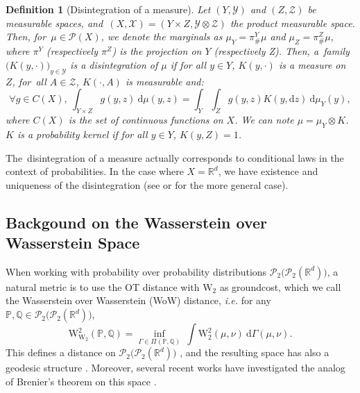 \documentclass[twoside]{article}
\newtheorem{definition}{Definition}
\newcommand{\cP}{\mathcal{P}}
\newcommand{\bP}{\mathbb{P}}
\newcommand{\bQ}{\mathbb{Q}}
\newcommand{\Ww}{\W_{\W_2}}
\newcommand{\cPP}[1]{\mathcal{P}_2\big(\cP_2(#1)\big)}
\newcommand{\W}{\mathrm{W}}
\newcommand{\R}{\mathbb{R}}
\begin{document}
\begin{definition}[Disintegration of a measure] \label{def:disintegration}
    Let $(Y,\mathcal{Y})$ and $(Z,\mathcal{Z})$ be measurable spaces, and~$(X,\mathcal{X})=(Y\times Z,\mathcal{Y}\otimes\mathcal{Z})$ the product measurable space. Then, for~$\mu\in\mathcal{P}(X)$, we denote the marginals as $\mu_Y = \pi^Y_\#\mu$ and $\mu_Z=\pi^Z_\#\mu$, where $\pi^Y$ (respectively $\pi^Z$) is the projection on $Y$ (respectively Z). Then, a~family $\big(K(y,\cdot)\big)_{y\in\mathcal{Y}}$ is a disintegration of $\mu$ if for all $y\in Y$, $K(y,\cdot)$ is a measure on $Z$, for~all $A\in\mathcal{Z}$, $K(\cdot,A)$ is measurable and:
    \begin{equation*}
        \forall g\in C(X),\ \int_{Y\times Z} g(y,z)\ \mathrm{d}\mu(y,z) = \int_Y\int_Z g(y,z)K(y,\mathrm{d}z)\ \mathrm{d}\mu_Y(y),
    \end{equation*}
    where $C(X)$ is the set of continuous functions on $X$. We can note $\mu=\mu_Y\otimes K$. $K$ is a probability kernel if for all $y\in Y$, $K(y,Z)=1$.
\end{definition}
The~disintegration of a measure actually corresponds to conditional laws in the context of probabilities. In the case where $X=\mathbb{R}^d$, we have existence and uniqueness of the disintegration (see \citep[Box 2.2]{santambrogio2015optimal} or \citep[Chapter 5]{ambrosio2008gradient} for the more general case).




\subsection{Backgound on the Wasserstein over Wasserstein Space} \label{appendix:bg_wow}



When working with probability over probability distributions $\cPP{\R^d}$, a natural metric is to use the OT distance with $\W_2$ as groundcost, which we call the Wasserstein over Wasserstein (WoW) distance, \emph{i.e.} for any $\bP,\bQ\in\cPP{\R^d}$,
\begin{equation}
    \Ww^2(\bP,\bQ) = \inf_{\Gamma\in\Pi(\bP,\bQ)} \ \int \W_2^2(\mu,\nu)\ \mathrm{d}\Gamma(\mu,\nu).
\end{equation}
This defines a distance on $\cPP{\R^d}$ \citep{nguyen2016borrowing}, and the resulting space has also a geodesic structure \citep{bonet2025flowing, pinzi2025totally}. Moreover, several recent works have investigated the analog of Brenier's theorem on this space \citep{emami2025optimal, pinzi2025totally, beiglbock2025brenier}.
\end{document}
